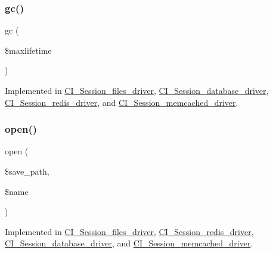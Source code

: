 \subsubsection{\texorpdfstring{gc()}{gc()}}
{\footnotesize\ttfamily gc (\begin{DoxyParamCaption}\item[{}]{\$maxlifetime }\end{DoxyParamCaption})}



Implemented in \mbox{\hyperlink{class_c_i___session__files__driver_a57aff7ee0656d8aa75d545fb8b3ae35d}{C\+I\+\_\+\+Session\+\_\+files\+\_\+driver}}, \mbox{\hyperlink{class_c_i___session__database__driver_a57aff7ee0656d8aa75d545fb8b3ae35d}{C\+I\+\_\+\+Session\+\_\+database\+\_\+driver}}, \mbox{\hyperlink{class_c_i___session__redis__driver_a57aff7ee0656d8aa75d545fb8b3ae35d}{C\+I\+\_\+\+Session\+\_\+redis\+\_\+driver}}, and \mbox{\hyperlink{class_c_i___session__memcached__driver_a57aff7ee0656d8aa75d545fb8b3ae35d}{C\+I\+\_\+\+Session\+\_\+memcached\+\_\+driver}}.

\mbox{\label{interface_session_handler_interface_a614b5cf3840833913c7a73260ed28e02}} 
\subsubsection{\texorpdfstring{open()}{open()}}
{\footnotesize\ttfamily open (\begin{DoxyParamCaption}\item[{}]{\$save\+\_\+path,  }\item[{}]{\$name }\end{DoxyParamCaption})}



Implemented in \mbox{\hyperlink{class_c_i___session__files__driver_a614b5cf3840833913c7a73260ed28e02}{C\+I\+\_\+\+Session\+\_\+files\+\_\+driver}}, \mbox{\hyperlink{class_c_i___session__redis__driver_a614b5cf3840833913c7a73260ed28e02}{C\+I\+\_\+\+Session\+\_\+redis\+\_\+driver}}, \mbox{\hyperlink{class_c_i___session__database__driver_a614b5cf3840833913c7a73260ed28e02}{C\+I\+\_\+\+Session\+\_\+database\+\_\+driver}}, and \mbox{\hyperlink{class_c_i___session__memcached__driver_a614b5cf3840833913c7a73260ed28e02}{C\+I\+\_\+\+Session\+\_\+memcached\+\_\+driver}}.

